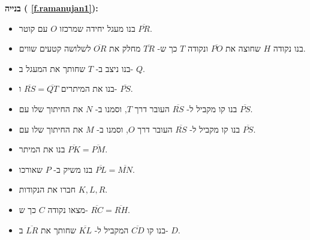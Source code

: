 \textbf{בנייה (%
\ref{f.ramanujan1}):}
\begin{itemize}
\item
בנו מעגל יחידה שמרכזו 
$O$
עם קוטר
$\overline{PR}$.
\item
בנו נקודה
$H$
שחוצה את
$\overline{PO}$
ונקודה
$T$
כך ש-%
$\overline{TR}$
מחלק את 
$\overline{OR}$
לשלושה קטעים שווים.
\item
בנו ניצב ב-%
$T$
שחותך את המעגל ב-%
$Q$.
\item
בנו את המיתרים
$\overline{RS}=\overline{QT}$
ו-%
$\overline{PS}$.
\item
בנו קו מקביל ל-%
$\overline{RS}$
העובר דרך
$T$,
וסמנו ב-%
$N$
את החיתוך שלו עם 
$\overline{PS}$.
\item
בנו קו מקביל ל-%
$\overline{RS}$
העובר דרך
$O$,
וסמנו ב-%
$M$
את החיתוך שלו עם 
$\overline{PS}$.
\item
בנו את המיתר
$\overline{PK}=\overline{PM}$.
\item
בנו משיק ב-%
$P$
שאורכו
$\overline{PL}=\overline{MN}$.
\item
חברו את הנקודות
$K,L,R$.
\item
מצאו נקודה 
$C$
כך ש-%
$\overline{RC}=\overline{RH}$.
\item
בנו קו
$\overline{CD}$
המקביל ל-%
$\overline{KL}$
שחותך את
$\overline{LR}$ 
ב-%
$D$. 
\end{itemize}

